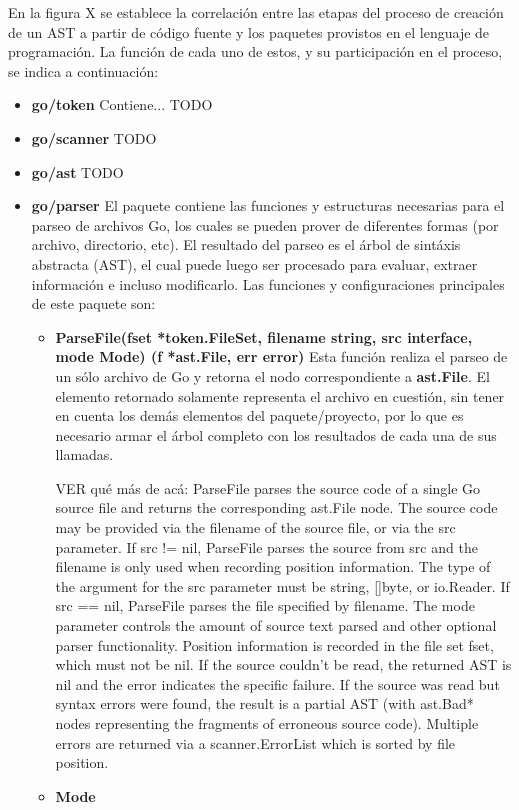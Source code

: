 En la figura X se establece la correlación entre las etapas del proceso de creación de un AST a partir de código fuente y los paquetes provistos en el lenguaje de programación.
La función de cada uno de estos, y su participación en el proceso, se indica a continuación:
\begin{itemize}
  \item \textbf{go/token} Contiene... TODO
  
  \item \textbf{go/scanner} TODO
  
  \item \textbf{go/ast} TODO
  
  \item \textbf{go/parser} El paquete contiene las funciones y estructuras necesarias para el parseo de archivos Go, los cuales se pueden prover de diferentes formas (por archivo, directorio, etc).
  El resultado del parseo es el árbol de sintáxis abstracta (AST), el cual puede luego ser procesado para evaluar, extraer información e incluso modificarlo.
  Las funciones y configuraciones principales de este paquete son:
  \begin{itemize}
    \item \textbf{ParseFile(fset *token.FileSet, filename string, src interface{}, mode Mode) (f *ast.File, err error)} Esta función realiza el parseo de un sólo archivo de Go y retorna el nodo correspondiente a \textbf{ast.File}. El elemento retornado solamente representa el archivo en cuestión, sin tener en cuenta los demás elementos del paquete/proyecto, por lo que es necesario armar el árbol completo con los resultados de cada una de sus llamadas.
    
    VER qué más de acá: ParseFile parses the source code of a single Go source file and returns the corresponding ast.File node. The source code may be provided via the filename of the source file, or via the src parameter. If src != nil, ParseFile parses the source from src and the filename is only used when recording position information. The type of the argument for the src parameter must be string, []byte, or io.Reader. If src == nil, ParseFile parses the file specified by filename. The mode parameter controls the amount of source text parsed and other optional parser functionality. Position information is recorded in the file set fset, which must not be nil. If the source couldn't be read, the returned AST is nil and the error indicates the specific failure. If the source was read but syntax errors were found, the result is a partial AST (with ast.Bad* nodes representing the fragments of erroneous source code). Multiple errors are returned via a scanner.ErrorList which is sorted by file position.

    \item \textbf{Mode}
    
  \end{itemize}
  
\end{itemize}
